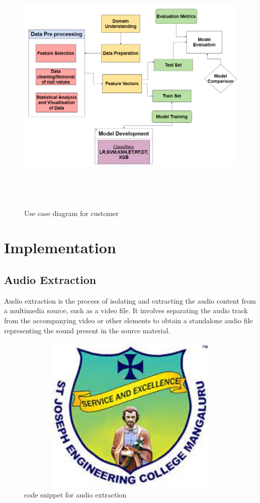 \documentclass[12pt,a4paper]{report}
\begin{document}
\begin{figure}[hbtp]
\centering
\includegraphics[width=9in,height=5in]{pic/flowchart.png}
\caption{Use case diagram for customer}
\end{figure}


\chapter{Implementation}


\section{Audio Extraction}
\par
Audio extraction is the process of isolating and extracting the audio content from a multimedia source, such as a video file. It involves separating the audio track from the accompanying video or other elements to obtain a standalone audio file representing the sound present in the source material.

\begin{figure}[hbtp]
\centering
\includegraphics[width=5in,height=3in]{./pic/sjeclogo.png}
\caption{code snippet for audio extraction}
\end{figure}
\end{document}
